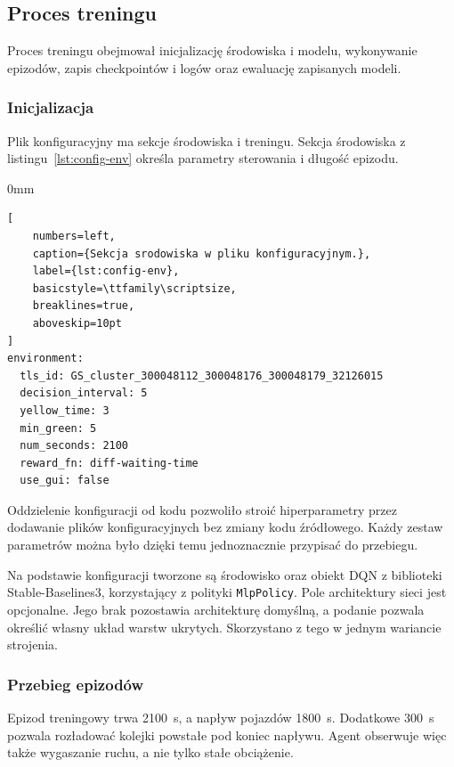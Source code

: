 \subsection{Proces treningu}
\label{subsec:proces-treningu}

Proces treningu obejmował inicjalizację środowiska i modelu, wykonywanie epizodów, zapis checkpointów i logów oraz ewaluację zapisanych modeli.

\subsubsection{Inicjalizacja}
\label{subsubsec:inicjalizacja-treningu}

Plik konfiguracyjny ma sekcje środowiska i treningu. Sekcja środowiska z listingu~\ref{lst:config-env} określa parametry sterowania i długość epizodu.

\begin{addmargin}[8mm]{0mm}
\begin{lstlisting}[
    numbers=left,
    caption={Sekcja srodowiska w pliku konfiguracyjnym.},
    label={lst:config-env},
    basicstyle=\ttfamily\scriptsize,
    breaklines=true,
    aboveskip=10pt
]
environment:
  tls_id: GS_cluster_300048112_300048176_300048179_32126015
  decision_interval: 5
  yellow_time: 3
  min_green: 5
  num_seconds: 2100
  reward_fn: diff-waiting-time
  use_gui: false
\end{lstlisting}
\end{addmargin}

Oddzielenie konfiguracji od kodu pozwoliło stroić hiperparametry przez dodawanie plików konfiguracyjnych bez zmiany kodu źródłowego. Każdy zestaw parametrów można było dzięki temu jednoznacznie przypisać do przebiegu.

Na podstawie konfiguracji tworzone są środowisko oraz obiekt DQN z biblioteki Stable-\allowbreak Baselines3, korzystający z polityki \texttt{MlpPolicy}. Pole architektury sieci jest opcjonalne. Jego brak pozostawia architekturę domyślną, a podanie pozwala określić własny układ warstw ukrytych. Skorzystano z tego w jednym wariancie strojenia.

\subsubsection{Przebieg epizodów}
\label{subsubsec:przebieg-epizodow}

Epizod treningowy trwa 2100~s, a napływ pojazdów 1800~s. Dodatkowe 300~s pozwala rozładować kolejki powstałe pod koniec napływu. Agent obserwuje więc także wygaszanie ruchu, a nie tylko stałe obciążenie.

